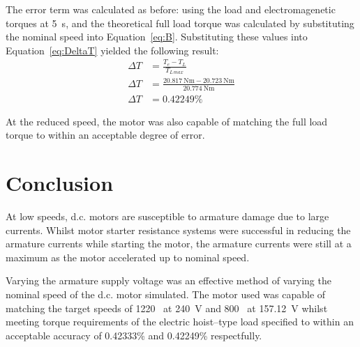 \documentclass[a4paper,11pt,twocolumn]{article}
\newcommand{\s}{\si{\second}\xspace}
\newcommand{\V}{\si{\volt}\xspace}
\newcommand{\Nm}{\si{\newton\metre}\xspace}
\newcommand{\RPM}{\text{RPM}\xspace}
\newcommand{\DC}{d.c.\xspace}
\begin{document}
The error term was calculated as before: using the load and electromagenetic 
torques at 5~\s, and the theoretical full load torque was calculated by 
substituting the nominal speed into Equation~\ref{eq:B}. Substituting these 
values into Equation~\ref{eq:DeltaT} yielded the following result:
\begin{align*}
    \Delta T &= \frac{T_e - T_L}{T_{L\,max}} \\
    \Delta T &= \frac{20.817~\Nm - 20.723~\Nm}{20.774~\Nm} \\
    \Delta T &= 0.42249\%
\end{align*}

At the reduced speed, the motor was also capable of matching the full load 
torque to within an acceptable degree of error.

\section{Conclusion}

At low speeds, \DC motors are susceptible to armature damage due to large 
currents. Whilst motor starter resistance systems were successful in reducing 
the armature currents while starting the motor, the armature currents were 
still at a maximum as the motor accelerated up to nominal speed.

Varying the armature supply voltage was an effective method of varying the 
nominal speed of the \DC motor simulated. The motor used was capable of 
matching the target speeds of 1220~\RPM at 240~\V and 800~\RPM at 157.12~\V 
whilst meeting torque requirements of the electric hoist--type load specified 
to within an acceptable accuracy of 0.42333\% and 0.42249\% respectfully.

\printbibliography
\end{document}
